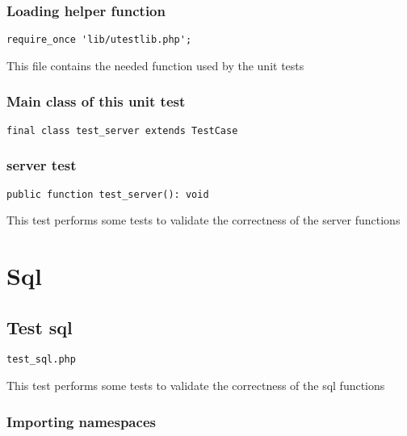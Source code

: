 \documentclass[a4paper]{article}
\begin{document}
\subsubsection{Loading helper function}

\begin{lstlisting}
require_once 'lib/utestlib.php';
\end{lstlisting}

This file contains the needed function used by the unit tests

\hypertarget{toc365}{}
\subsubsection{Main class of this unit test}

\begin{lstlisting}
final class test_server extends TestCase
\end{lstlisting}

\hypertarget{toc366}{}
\subsubsection{server test}

\begin{lstlisting}
public function test_server(): void
\end{lstlisting}

This test performs some tests to validate the correctness
of the server functions


\hypertarget{toc367}{}
\section{Sql}

\hypertarget{toc368}{}
\subsection{Test sql}

\begin{lstlisting}
test_sql.php
\end{lstlisting}

This test performs some tests to validate the correctness
of the sql functions

\hypertarget{toc369}{}
\subsubsection{Importing namespaces}
\end{document}
